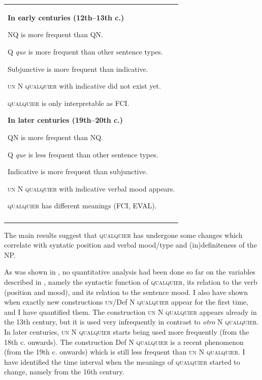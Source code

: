 \begin{table}
\begin{tabularx}{\textwidth}{X}
\lsptoprule
{\bfseries {In early centuries (12th–13th c.)} }

  NQ is more frequent than QN.

  Q \textit{que} is more frequent than other sentence types.

  Subjunctive is more frequent than indicative.

  \textsc{un} N \textsc{qualquier} with indicative did not exist yet.

  \textsc{qualquier} is only interpretable as FCI.


  {\bfseries {In later centuries (19th–20th c.)}}

  QN is more frequent than NQ.

  Q \textit{que} is less frequent than other sentence types.

  Indicative is more frequent than subjunctive.

  \textsc{un} N \textsc{qualquier} with indicative verbal mood appears.

  \textsc{qualquier} has different meanings (FCI, EVAL).\\
\lspbottomrule
\end{tabularx}
\end{table}

The main results suggest that \textsc{qualquier} has undergone some changes which correlate with syntatic position and verbal mood/type and (in)definiteness of the NP.

  As was shown in , no quantitative analysis had been done so far on the variables described in , namely the syntactic function of \textsc{qualquier}, its relation to the verb (position and mood), and its relation to the sentence mood. I also have shown when exactly new constructions \textsc{un}/Def N \textsc{qualquier} appear for the first time, and I have quantified them. The construction \textsc{un} N \textsc{qualquier} appears already in the 13th century, but it is used very infrequently in contrast to \textit{otro} N \textsc{qualquier}. In later centuries, \textsc{un} N \textsc{qualquier} starts being used more frequently (from the 18th c. onwards). The construction Def N \textsc{qualquier} is a recent phenomenon (from the 19th c. onwards) which is still less frequent than \textsc{un} N \textsc{qualquier.} I have identified the time interval when the meanings of \textsc{qualquier} started to change, namely from the 16th century.

